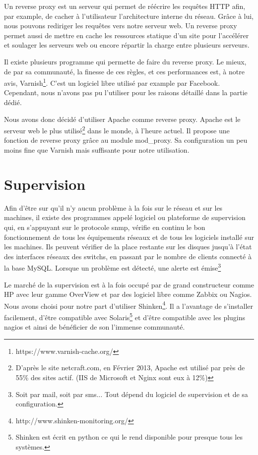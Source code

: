 \documentclass{report}
\begin{document}
Un reverse proxy est un serveur qui permet de réécrire les requêtes HTTP afin, par example, de cacher à l'utilisateur l'architecture interne du réseau. Grâce à lui, nous pouvons rediriger les requêtes vers notre serveur web.
Un reverse proxy permet aussi de mettre en cache les ressources statique d'un site pour l'accélérer et soulager les serveurs web ou encore répartir la charge entre plusieurs serveurs.

Il existe plusieurs programme qui permette de faire du reverse proxy. Le mieux, de par sa communauté, la finesse de ces règles, et ces performances est, à notre avis, Varnish\footnote{https://www.varnish-cache.org/}. C'est un logiciel libre utilisé par example par Facebook. Cependant, nous n'avons pas pu l'utiliser pour les raisons détaillé dans la partie dédié.

Nous avons donc décidé d'utiliser Apache comme reverse proxy. Apache est le serveur web le plus utilisé\footnote{D'après le site netcraft.com, en Février 2013, Apache est utilisé par près de 55\% des sites actif. (IIS de Microsoft et Nginx sont eux à 12\%)} dans le monde, à l'heure actuel. Il propose une fonction de reverse proxy grâce au module mod\_proxy. Sa configuration un peu moins fine que Varnish mais suffisante pour notre utilisation.

\section{Supervision}
Afin d'être sur qu'il n'y aucun problème à la fois sur le réseau et sur les machines, il existe des programmes appelé logiciel ou plateforme de supervision qui, en s'appuyant sur le protocole snmp, vérifie en continu le bon fonctionnement de tous les équipements réseaux et de tous les logiciels installé sur les machines. Ils peuvent vérifier de la place restante sur les disques jusqu'à l'état des interfaces réseaux des switchs, en passant par le nombre de clients connecté à la base MySQL. Lorsque un problème est détecté, une alerte est émise\footnote{Soit par mail, soit par sms... Tout dépend du logiciel de supervision et de sa configuration.}

Le marché de la supervision est à la fois occupé par de grand constructeur comme HP avec leur gamme OverView et par des logiciel libre comme Zabbix ou Nagios. Nous avons choisi pour notre part d'utiliser Shinken\footnote{http://www.shinken-monitoring.org/}. Il a l'avantage de s'installer facilement, d'être compatible avec Solaris\footnote{Shinken est écrit en python ce qui le rend disponible pour presque tous les systèmes.} et d'être compatible avec les plugins nagios et ainsi de bénéficier de son l'immense communauté.
\end{document}
